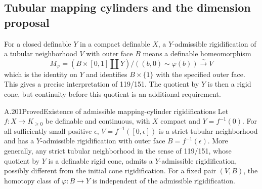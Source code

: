 \subsection{Tubular mapping cylinders and the dimension proposal}

For a closed definable $Y$ in a compact definable $X$, a
$Y$-admissible rigidification of a tubular neighborhood $V$ with outer
face $B$ means a definable homeomorphism
\[
 M_\varphi=(B\times[0,1]\amalg Y)/((b,0)\sim\varphi(b))
 \xrightarrow{\sim}V
\]
which is the identity on $Y$ and identifies $B\times\{1\}$ with the
specified outer face. This gives a precise interpretation of 119/151.
The quotient by $Y$ is then a rigid cone, but continuity before this
quotient is an additional requirement.

\begin{saresult}{A.201}{Proved}{Existence of admissible mapping-cylinder rigidifications}
Let $f:X\to K_{\ge0}$ be definable and continuous, with $X$ compact
and $Y=f^{-1}(0)$. For all sufficiently small positive $\epsilon$,
$V=f^{-1}([0,\epsilon])$ is a strict tubular neighborhood and has a
$Y$-admissible rigidification with outer face $B=f^{-1}(\epsilon)$.
More generally, any strict tubular neighborhood in the sense of
119/151, whose quotient by $Y$ is a definable rigid cone, admits a
$Y$-admissible rigidification, possibly different from the initial
cone rigidification. For a fixed pair $(V,B)$, the homotopy class of
$\varphi:B\to Y$ is independent of the admissible rigidification.
\end{saresult}
